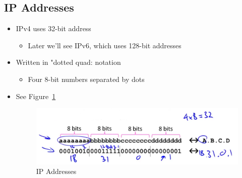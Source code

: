 \documentclass[12pt]{ctexart}   %
\begin{document}
	\subsection{IP Addresses}
	\begin{itemize}
		\item IPv4 uses 32-bit address
		\begin{itemize}
			\item Later we'll see IPv6, which uses 128-bit addresses
		\end{itemize}
		
		\item Written in "dotted quad: notation
		\begin{itemize}
			\item Four 8-bit numbers separated by dots
		\end{itemize}
		\item See Figure~\ref{fig:4-4-2}
		
		\begin{figure}[h!] %
		\centering
		 \includegraphics[scale=0.7]{images/4-4-2}
		\caption{ IP Addresses}
		 \label{fig:4-4-2}
		 \end{figure}
	\end{itemize}
	
\end{document}
